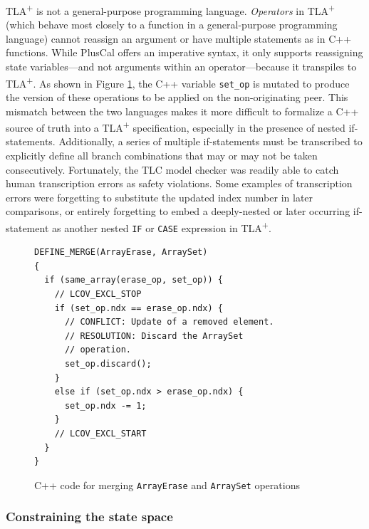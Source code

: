 \documentclass{vldb}
\begin{document}
TLA\textsuperscript{+} is not a general-purpose programming language. \emph{Operators} in TLA\textsuperscript{+} (which behave most closely to a function in a general-purpose programming language) cannot reassign an argument or have multiple statements as in C++ functions.
While PlusCal offers an imperative syntax, it only supports reassigning state variables---and not arguments within an operator---because it transpiles to TLA\textsuperscript{+}.
As shown in Figure \ref{fig:cpp_erase_set_merge}, the C++ variable \texttt{set\_op} is mutated to produce the version of these operations to be applied on the non-originating peer. This mismatch between the two languages makes it more difficult to formalize a C++ source of truth into a TLA\textsuperscript{+} specification, especially in the presence of nested if-statements. Additionally, a series of multiple if-statements must be transcribed to explicitly define all branch combinations that may or may not be taken consecutively. Fortunately, the TLC model checker was readily able to catch human transcription errors as safety violations. Some examples of transcription errors were forgetting to substitute the updated index number in later comparisons, or entirely forgetting to embed a deeply-nested or later occurring if-statement as another nested \texttt{IF} or \texttt{CASE} expression in TLA\textsuperscript{+}.

\begin{figure}
\begin{verbatim}
DEFINE_MERGE(ArrayErase, ArraySet)
{
  if (same_array(erase_op, set_op)) {
    // LCOV_EXCL_STOP
    if (set_op.ndx == erase_op.ndx) {
      // CONFLICT: Update of a removed element.
      // RESOLUTION: Discard the ArraySet
      // operation.
      set_op.discard();
    }
    else if (set_op.ndx > erase_op.ndx) {
      set_op.ndx -= 1;
    }
    // LCOV_EXCL_START
  }
}
\end{verbatim}
\caption{C++ code for merging \texttt{ArrayErase} and \texttt{ArraySet} operations}
\label{fig:cpp_erase_set_merge}
\end{figure}

\vspace{10 mm}

\subsubsection{Constraining the state space}
\end{document}
